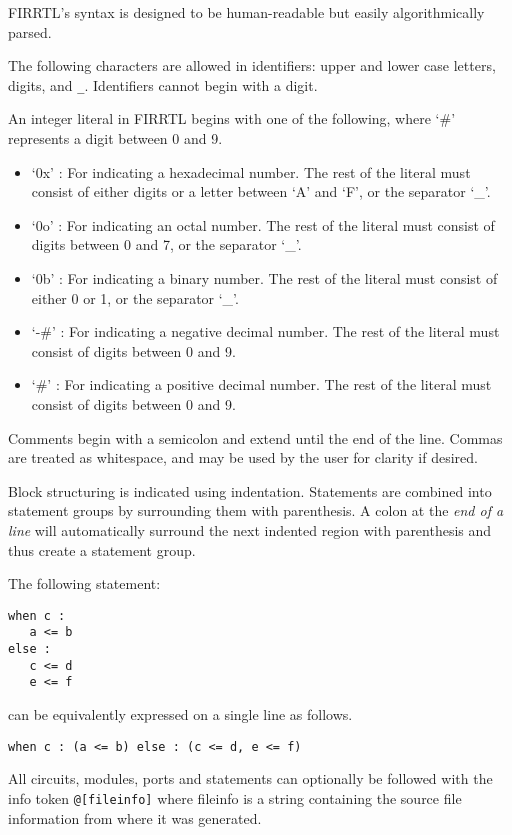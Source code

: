 \documentclass[12pt]{article}
\begin{document}
FIRRTL's syntax is designed to be human-readable but easily algorithmically parsed.

The following characters are allowed in identifiers: upper and lower case letters, digits, and \verb|_|. Identifiers cannot begin with a digit. 

An integer literal in FIRRTL begins with one of the following, where `\#' represents a digit between 0 and 9. 
\begin{itemize}
\item `0x' : For indicating a hexadecimal number. The rest of the literal must consist of either digits or a letter between `A' and `F', or the separator `\_'. 
\item `0o' : For indicating an octal number. The rest of the literal must consist of digits between 0 and 7, or the separator `\_'. 
\item `0b' : For indicating a binary number. The rest of the literal must consist of either 0 or 1, or the separator `\_'.
\item `-\#' : For indicating a negative decimal number. The rest of the literal must consist of digits between 0 and 9.
\item `\#' : For indicating a positive decimal number. The rest of the literal must consist of digits between 0 and 9.
\end{itemize}

Comments begin with a semicolon and extend until the end of the line. Commas are treated as whitespace, and may be used by the user for clarity if desired.

Block structuring is indicated using indentation. Statements are combined into statement groups by surrounding them with parenthesis. A colon at the {\em end of a line} will automatically surround the next indented region with parenthesis and thus create a statement group.

The following statement:
\begin{lstlisting}
when c :
   a <= b
else :
   c <= d
   e <= f
\end{lstlisting}
can be equivalently expressed on a single line as follows.
\begin{lstlisting}
when c : (a <= b) else : (c <= d, e <= f)
\end{lstlisting}

All circuits, modules, ports and statements can optionally be followed with the info token \verb|@[fileinfo]| where fileinfo is a string containing the source file information from where it was generated.
\end{document}
